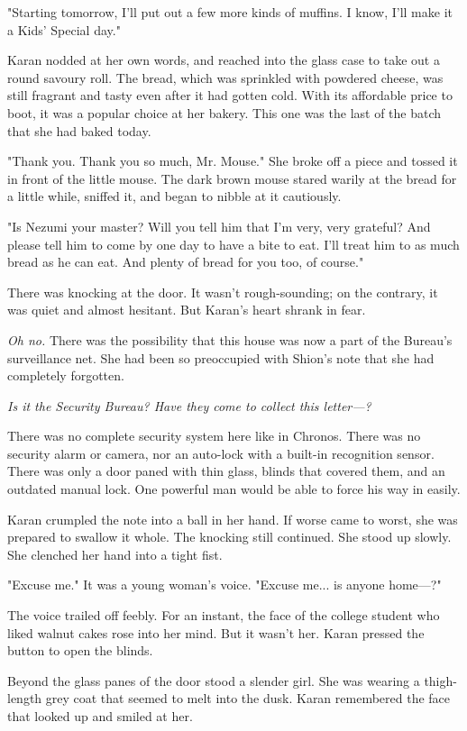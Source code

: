 "Starting tomorrow, I'll put out a few more kinds of muffins. I know,
I'll make it a Kids' Special day."

Karan nodded at her own words, and reached into the glass case to take
out a round savoury roll. The bread, which was sprinkled with powdered
cheese, was still fragrant and tasty even after it had gotten cold. With
its affordable price to boot, it was a popular choice at her bakery.
This one was the last of the batch that she had baked today.

"Thank you. Thank you so much, Mr. Mouse." She broke off a piece and
tossed it in front of the little mouse. The dark brown mouse stared
warily at the bread for a little while, sniffed it, and began to nibble
at it cautiously.

"Is Nezumi your master? Will you tell him that I'm very, very grateful?
And please tell him to come by one day to have a bite to eat. I'll treat
him to as much bread as he can eat. And plenty of bread for you too, of
course."

There was knocking at the door. It wasn't rough-sounding; on the
contrary, it was quiet and almost hesitant. But Karan's heart shrank in
fear.

\emph{Oh no.} There was the possibility that this house was now a part of the
Bureau's surveillance net. She had been so preoccupied with Shion's note
that she had completely forgotten.

\emph{Is it the Security Bureau? Have they come to collect this letter---?}

There was no complete security system here like in Chronos. There was no
security alarm or camera, nor an auto-lock with a built-in recognition
sensor. There was only a door paned with thin glass, blinds that covered
them, and an outdated manual lock. One powerful man would be able to
force his way in easily.

Karan crumpled the note into a ball in her hand. If worse came to worst,
she was prepared to swallow it whole. The knocking still continued. She
stood up slowly. She clenched her hand into a tight fist.

"Excuse me." It was a young woman's voice. "Excuse me... is anyone
home---?"

The voice trailed off feebly. For an instant, the face of the college
student who liked walnut cakes rose into her mind. But it wasn't her.
Karan pressed the button to open the blinds.

Beyond the glass panes of the door stood a slender girl. She was wearing
a thigh-length grey coat that seemed to melt into the dusk. Karan
remembered the face that looked up and smiled at her.

